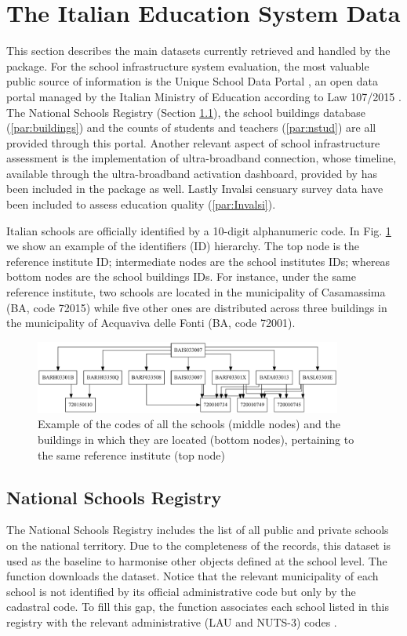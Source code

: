 \documentclass{article}%
\begin{document}
\section{The Italian Education System Data} \label{sec:Data}
This section describes the main datasets currently retrieved and handled by the package. For the school infrastructure system evaluation, the most valuable public source of information is the Unique School Data Portal \citep{MIUR}, an open data portal managed by the Italian Ministry of Education according to Law 107/2015 \citep{law2}. The National Schools Registry (Section \ref{par:registry}), the school buildings database (\ref{par:buildings}) and the counts of students and teachers (\ref{par:nstud}) are all provided through this portal. Another relevant aspect of school infrastructure assessment is the implementation of ultra-broadband connection, whose timeline, available through the ultra-broadband activation dashboard, provided by \cite{BB} has been included in the package as well.
Lastly Invalsi censuary survey data \citep{Invalsi_IS} have been included to assess education quality (\ref{par:Invalsi}).

Italian schools are officially identified by a 10-digit alphanumeric code. In Fig. \ref{fig:diagram} we show an example of the identifiers (ID) hierarchy. The top node is the reference institute ID; intermediate nodes are the school institutes IDs; whereas bottom nodes are the school buildings IDs. For instance, under the same reference institute, two schools are located in the municipality of Casamassima (BA, code 72015) while five other ones are distributed across three buildings in the municipality of Acquaviva delle Fonti (BA, code 72001).
\begin{figure}
  \centering
  \includegraphics[width = 0.9\textwidth]{Fig2.pdf} 
  \caption{Example of the codes of all the schools (middle nodes) and the buildings in which they are located (bottom nodes), pertaining to the same reference institute (top node)}
  \label{fig:diagram}
\end{figure}

\subsection{National Schools Registry} \label{par:registry}
The National Schools Registry includes the list of all public and private schools on the national territory. Due to the completeness of the records, this dataset is used as the baseline to harmonise other objects defined at the school level. The function \texttt{} downloads the dataset. Notice that the relevant municipality of each school is not identified by its official administrative code but only by the cadastral code. To fill this gap, the function \texttt{} associates each school listed in this registry with the relevant administrative (LAU and NUTS-3) codes \citep{Situas}.
\end{document}
